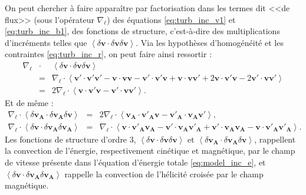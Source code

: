 On peut  chercher à faire apparaître par factorisation dans les termes dit <<de flux>> (sous l'opérateur $\nabla_{\boldsymbol{\ell}} $) des équations \eqref{eq:turb_inc_v1} et \eqref{eq:turb_inc_b1}, des fonctions de structure, c'est-à-dire des multiplications d'incréments telles que $\left<\delta \boldsymbol{v} \cdot \delta \boldsymbol{v} \delta \boldsymbol{v} \right>$. Via les hypothèses d'homogénéité et les contraintes \eqref{eq:turb_inc_r}, on peut faire ainsi ressortir : 
\begin{eqnarray}
\label{eq:turb_inc_fs1} \nabla_{\boldsymbol{\ell}} &\cdot& \left<\delta \boldsymbol{v} \cdot \delta \boldsymbol{v} \delta \boldsymbol{v} \right> \nonumber \\
 &=&  \nabla_{\boldsymbol{\ell}} \cdot \left<  \boldsymbol{v'} \cdot \boldsymbol{v'} \boldsymbol{v'} - \boldsymbol{v} \cdot \boldsymbol{v} \boldsymbol{v} - \boldsymbol{v'} \cdot \boldsymbol{v'} \boldsymbol{v} + \boldsymbol{v} \cdot \boldsymbol{v} \boldsymbol{v'} + 2 \boldsymbol{v} \cdot \boldsymbol{v'} \boldsymbol{v} - 2 \boldsymbol{v'} \cdot \boldsymbol{v} \boldsymbol{v'}\right>  \nonumber\\
  &=& 2 \nabla_{\boldsymbol{\ell}} \cdot \left< \boldsymbol{v} \cdot \boldsymbol{v'} \boldsymbol{v} - \boldsymbol{v'} \cdot \boldsymbol{v} \boldsymbol{v'}\right>.
\end{eqnarray}
Et de même : 
\begin{eqnarray}
\label{eq:turb_inc_fs2}  \nabla_{\boldsymbol{\ell}} \cdot \left<\delta \boldsymbol{v_A} \cdot \delta \boldsymbol{v_A} \delta \boldsymbol{v} \right>  &=& 2 \nabla_{\boldsymbol{\ell}} \cdot \left< \boldsymbol{v_A} \cdot \boldsymbol{v'_A} \boldsymbol{v} - \boldsymbol{v'_A} \cdot \boldsymbol{v_A} \boldsymbol{v'}\right> ,\\
\label{eq:turb_inc_fs3}   \nabla_{\boldsymbol{\ell}} \cdot \left<\delta \boldsymbol{v} \cdot \delta \boldsymbol{v_A} \delta \boldsymbol{v_A} \right>  &=&  \nabla_{\boldsymbol{\ell}} \cdot \left< \boldsymbol{v} \cdot \boldsymbol{v'_A} \boldsymbol{v_A} - \boldsymbol{v'} \cdot \boldsymbol{v_A} \boldsymbol{v'_A} + \boldsymbol{v'} \cdot \boldsymbol{v_A} \boldsymbol{v_A} - \boldsymbol{v} \cdot \boldsymbol{v'_A} \boldsymbol{v'_A}\right> .\quad
\end{eqnarray}
Les fonctions de structure d'ordre 3, $\left<\delta \boldsymbol{v} \cdot \delta \boldsymbol{v} \delta \boldsymbol{v} \right>$ et $\left<\delta \boldsymbol{v_A} \cdot \delta \boldsymbol{v_A} \delta \boldsymbol{v} \right>$, rappellent la convection de l'énergie, respectivement cinétique et magnétique, par le champ de vitesse présente dans l'équation d'énergie totale \eqref{eq:model_inc_e}, et $\left<\delta \boldsymbol{v} \cdot \delta \boldsymbol{v_A} \delta \boldsymbol{v_A} \right>$ rappelle la convection de l'hélicité croisée par le champ magnétique.


